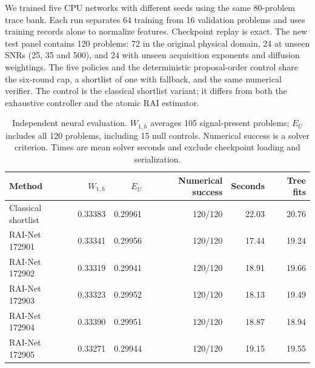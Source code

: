 \label{app:neuralexpanded}
We trained five CPU networks with different seeds using the same 80-problem
trace bank. Each run separates 64 training from 16 validation problems and uses
training records alone to normalize features. Checkpoint replay is exact.
The new test panel contains 120 problems: 72 in the original physical domain,
24 at unseen SNRs (25, 35 and 500), and 24 with unseen acquisition exponents
and diffusion weightings. The five policies and the deterministic proposal-order
control share the six-round cap, a shortlist of one with fallback, and the same
numerical verifier. The control is the classical shortlist variant; it differs
from both the exhaustive controller and the atomic RAI estimator.
\begin{table}[htbp]
\caption{Independent neural evaluation. $W_{1,h}$ averages 105 signal-present problems; $E_U$ includes all 120 problems, including 15 null controls. Numerical success is a solver criterion. Times are mean solver seconds and exclude checkpoint loading and serialization.}
\label{tab:neuralexpanded}
\centering
\begin{tabular}{lrrrrr}
\toprule
Method & $W_{1,h}$ & $E_U$ & Numerical success & Seconds & Tree fits \\
\midrule
Classical shortlist & 0.33383 & 0.29961 & 120/120 & 22.03 & 20.76 \\
RAI-Net 172901 & 0.33341 & 0.29956 & 120/120 & 17.44 & 19.24 \\
RAI-Net 172902 & 0.33319 & 0.29941 & 120/120 & 18.91 & 19.66 \\
RAI-Net 172903 & 0.33323 & 0.29952 & 120/120 & 18.13 & 19.49 \\
RAI-Net 172904 & 0.33390 & 0.29951 & 120/120 & 18.87 & 18.94 \\
RAI-Net 172905 & 0.33271 & 0.29944 & 120/120 & 19.15 & 19.55 \\
\bottomrule
\end{tabular}
\end{table}

